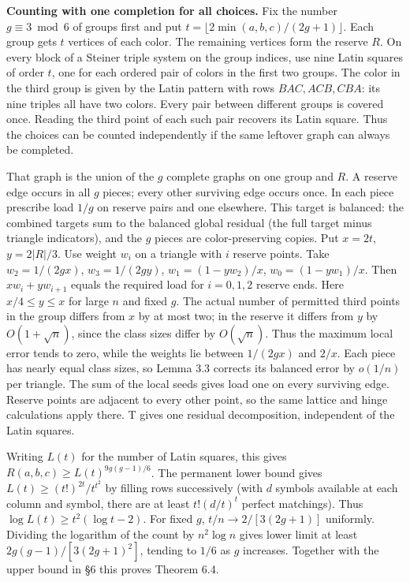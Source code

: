 \documentclass[english,11pt,a4paper]{article}
\begin{document}
\textbf{Counting with one completion for all choices.} Fix the number \(g\equiv3\bmod6\) of groups first and put \(t=\lfloor2\min(a,b,c)/(2g+1)\rfloor\). Each group gets \(t\) vertices of each color. The remaining vertices form the reserve \(R\). On every block of a Steiner triple system on the group indices, use nine Latin squares of order \(t\), one for each ordered pair of colors in the first two groups. The color in the third group is given by the Latin pattern with rows \(BAC,ACB,CBA\): its nine triples all have two colors. Every pair between different groups is covered once. Reading the third point of each such pair recovers its Latin square. Thus the choices can be counted independently if the same leftover graph can always be completed.

That graph is the union of the \(g\) complete graphs on one group and \(R\). A reserve edge occurs in all \(g\) pieces; every other surviving edge occurs once. In each piece prescribe load \(1/g\) on reserve pairs and one elsewhere. This target is balanced: the combined targets sum to the balanced global residual (the full target minus triangle indicators), and the \(g\) pieces are color-preserving copies. Put \(x=2t\), \(y=2|R|/3\). Use weight \(w_i\) on a triangle with \(i\) reserve points. Take \(w_2=1/(2gx)\), \(w_3=1/(2gy)\), \(w_1=(1-yw_2)/x\), \(w_0=(1-yw_1)/x\). Then \(xw_i+yw_{i+1}\) equals the required load for \(i=0,1,2\) reserve ends. Here \(x/4\le y\le x\) for large \(n\) and fixed \(g\). The actual number of permitted third points in the group differs from \(x\) by at most two; in the reserve it differs from \(y\) by \(O(1+\sqrt n)\), since the class sizes differ by \(O(\sqrt n)\). Thus the maximum local error tends to zero, while the weights lie between \(1/(2gx)\) and \(2/x\). Each piece has nearly equal class sizes, so Lemma 3.3 corrects its balanced error by \(o(1/n)\) per triangle. The sum of the local seeds gives load one on every surviving edge. Reserve points are adjacent to every other point, so the same lattice and hinge calculations apply there. T gives one residual decomposition, independent of the Latin squares.

Writing \(L(t)\) for the number of Latin squares, this gives \(R(a,b,c)\ge L(t)^{9g(g-1)/6}\). The permanent lower bound gives \(L(t)\ge (t!)^{2t}/t^{t^2}\) by filling rows successively (with \(d\) symbols available at each column and symbol, there are at least \(t!(d/t)^t\) perfect matchings). Thus \(\log L(t)\ge t^2(\log t-2)\). For fixed \(g\), \(t/n\to 2/[3(2g+1)]\) uniformly. Dividing the logarithm of the count by \(n^2\log n\) gives lower limit at least \(2g(g-1)/[3(2g+1)^2]\), tending to \(1/6\) as \(g\) increases. Together with the upper bound in §6 this proves Theorem 6.4.
\end{document}
